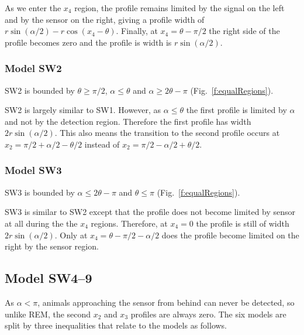 As we enter the $x_4$ region, the profile remains limited by the signal on the left and by the sensor on the right, giving a profile width of  $r\sin (\alpha /2) -r\cos(x_4-\theta) $. Finally, at $x_4 = \theta - \pi/2$ the right side of the profile becomes zero and the profile is width is $r\sin(\alpha /2)$.



\subsubsection{Model SW2} \label{SW2}

SW2 is bounded by $\theta \ge \pi/2$, $\alpha \le \theta$ and $\alpha \ge 2\theta -\pi$ (Fig.~\ref{f:equalRegions}).

SW2 is largely similar to SW1. However, as $\alpha \le \theta$ the first profile is limited by $\alpha$ and not by the detection region. Therefore the first profile has width $2r\sin(\alpha /2)$. This also means the transition to the second profile occurs at  $x_2 = \pi/2 + \alpha/2 - \theta/2$ instead of  $x_2 = \pi/2 - \alpha/2 + \theta/2$.





\subsubsection{Model SW3} \label{SW3}

SW3 is bounded by $\alpha \le 2\theta -\pi$ and $\theta \le \pi$ (Fig.~\ref{f:equalRegions}).

SW3 is similar to SW2 except that the profile does not become limited by sensor at all during the the $x_4$ regions. Therefore, at $x_4 = 0 $ the profile is still of width $2r\sin(\alpha /2)$. Only at $x_4 = \theta - \pi/2 - \alpha/2$ does the profile become limited on the right by the sensor region.




\subsection{Model SW4--9} \label{SW4--9}

As $\alpha < \pi$, animals approaching the sensor from behind can never be detected, so unlike REM, the second $x_2$ and $x_3$ profiles are always zero. The six models are split by three inequalities that relate to the models as follows.

